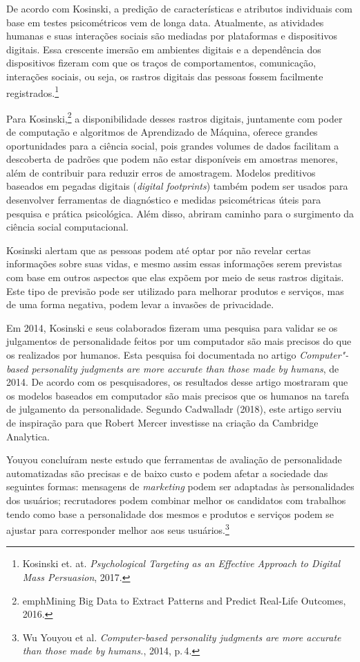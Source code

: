 De acordo com Kosinski, a predição de características e
atributos individuais com base em testes psicométricos vem de longa
data. Atualmente, as atividades humanas e suas interações sociais são
mediadas por plataformas e dispositivos digitais. Essa crescente imersão
em ambientes digitais e a dependência dos dispositivos fizeram com que
os traços de comportamentos, comunicação, interações sociais, ou seja,
os rastros digitais das pessoas fossem facilmente registrados.\footnote{Kosinski et. at. \textit{Psychological Targeting as an Effective Approach to Digital Mass
Persuasion}, 2017.}

Para Kosinski,\footnote{emph{Mining Big Data to Extract Patterns and Predict Real-Life
Outcomes}, 2016.} a disponibilidade desses rastros digitais,
juntamente com poder de computação e algoritmos de Aprendizado de
Máquina, oferece grandes oportunidades para a ciência social, pois
grandes volumes de dados facilitam a descoberta de padrões que podem não
estar disponíveis em amostras menores, além de contribuir para reduzir
erros de amostragem. Modelos preditivos baseados em pegadas digitais
(\textit{digital footprints}) também podem ser usados para desenvolver
ferramentas de diagnóstico e medidas psicométricas úteis para pesquisa e
prática psicológica. Além disso, abriram caminho para o surgimento da
ciência social computacional.

Kosinski alertam que as pessoas podem até optar por não
revelar certas informações sobre suas vidas, e mesmo assim essas
informações serem previstas com base em outros aspectos que elas expõem
por meio de seus rastros digitais. Este tipo de previsão pode ser
utilizado para melhorar produtos e serviços, mas de uma forma negativa,
podem levar a invasões de privacidade.

Em 2014, Kosinski e seus colaborados fizeram uma pesquisa para validar
se os julgamentos de personalidade feitos por um computador são mais
precisos do que os realizados por humanos. Esta pesquisa foi documentada
no artigo \textit{Computer"-based personality judgments are more accurate
than those made by humans}, de 2014. De acordo com os
pesquisadores, os resultados desse artigo mostraram que os modelos
baseados em computador são mais precisos que os humanos na tarefa de
julgamento da personalidade. Segundo Cadwalladr (2018), este artigo
serviu de inspiração para que Robert Mercer investisse na criação da
Cambridge Analytica.

Youyou concluíram neste estudo que ferramentas de avaliação
de personalidade automatizadas são precisas e de baixo custo e podem
afetar a sociedade das seguintes formas: mensagens de \textit{marketing} podem
ser adaptadas às personalidades dos usuários; recrutadores podem
combinar melhor os candidatos com trabalhos tendo como base a
personalidade dos mesmos e produtos e serviços podem se ajustar para
corresponder melhor aos seus usuários.\footnote{Wu Youyou et al. \textit{Computer-based personality judgments are more accurate than
those made by humans.}, 2014, p.\,4.}

